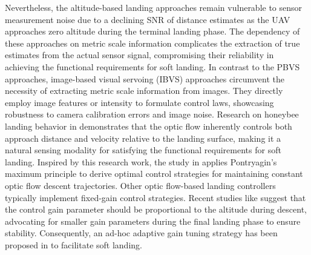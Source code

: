 \documentclass{IEEEtaes}
\begin{document}
Nevertheless, the altitude-based landing approaches remain vulnerable to sensor measurement noise due to a declining SNR of distance estimates as the UAV approaches zero altitude during the terminal landing phase.
The dependency of these approaches on metric scale information complicates the extraction of true estimates from the actual sensor signal, compromising their reliability in achieving the functional requirements for soft landing.
In contrast to the PBVS approaches, image-based visual servoing (IBVS) approaches \cite{izzo2011, herisse2012, alkowatly2015, ho2018, cho2022} circumvent the necessity of extracting metric scale information from images.
They directly employ image features or intensity to formulate control laws, showcasing robustness to camera calibration errors and image noise.
Research on honeybee landing behavior in \cite{baird2013} demonstrates that the optic flow inherently controls both approach distance and velocity relative to the landing surface, making it a natural sensing modality for satisfying the functional requirements for soft landing.
Inspired by this research work, the study in \cite{izzo2011} applies Pontryagin’s maximum principle to derive optimal control strategies for maintaining constant optic flow descent trajectories.
Other optic flow-based landing controllers \cite{herisse2012, alkowatly2015, ho2018} typically implement fixed-gain control strategies.
Recent studies like \cite{deCroon2016, ho2018} suggest that the control gain parameter should be proportional to the altitude during descent, advocating for smaller gain parameters during the final landing phase to ensure stability.
Consequently, an ad-hoc adaptive gain tuning strategy has been proposed in \cite{ho2018} to facilitate soft landing.
\end{document}
